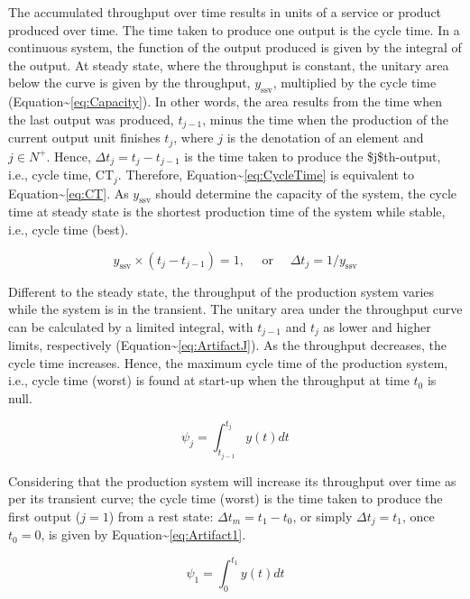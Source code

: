 \documentclass{article}
\begin{document}
\begin{enumerate}
The accumulated throughput over time results in units of a service or product produced over time.
The time taken to produce one output is the cycle time.
In a continuous system, the function of the output produced is given by the integral of the output.
At steady state, where the throughput is constant, the unitary area below the curve is given by the throughput, \(y_{\mbox{ssv}}\), multiplied by the cycle time (Equation\textasciitilde{}\ref{eq:Capacity}).
In other words, the area results from the time when the last output was produced, \(t_{j-1}\), minus the time when the production of the current output unit finishes \(t_j\), where \(j\) is the denotation of an element and \(j \in N^+\).
Hence, \(\Delta t_j=t_j-t_{j-1}\) is the time taken to produce the \$j\$th-output, i.e., cycle time, \(\mbox{CT}_j\).
Therefore, Equation\textasciitilde{}\ref{eq:CycleTime} is equivalent to Equation\textasciitilde{}\ref{eq:CT}.
As \(y_{\mbox{ssv}}\) should determine the capacity of the system, the cycle time at steady state is the shortest production time of the system while stable, i.e., cycle time (best).

\begin{equation}\label{eq:CycleTime}
	y_{\mbox{ssv}} \times (t_j-t_{j-1}) = 1, \quad\mbox{ or }\quad \Delta t_j = 1/y_{\mbox{ssv}}
\end{equation}

Different to the steady state, the throughput of the production system varies while the system is in the transient.
The unitary area under the throughput curve can be calculated by a limited integral, with \(t_{j-1}\) and \(t_j\) as lower and higher limits, respectively (Equation\textasciitilde{}\ref{eq:ArtifactJ}).
As the throughput decreases, the cycle time increases.
Hence, the maximum cycle time of the production system, i.e., cycle time (worst) is found at start-up when the throughput at time \(t_0\) is null.

\begin{equation}\label{eq:ArtifactJ}
	\psi_j = \int_{t_{j-1}}^{t_j} y(t)dt
\end{equation}

Considering that the production system will increase its throughput over time as per its transient curve; the cycle time (worst) is the time taken to produce the first output (\(j=1\)) from a rest state: \(\Delta t_m = t_1-t_0\), or simply \(\Delta t_j = t_1\), once \(t_0 = 0\), is given by Equation\textasciitilde{}\ref{eq:Artifact1}.

\begin{equation}\label{eq:Artifact1}
	\psi_1 = \int_{0}^{t_1} y(t)dt
\end{equation}


\end{enumerate}
\end{document}

